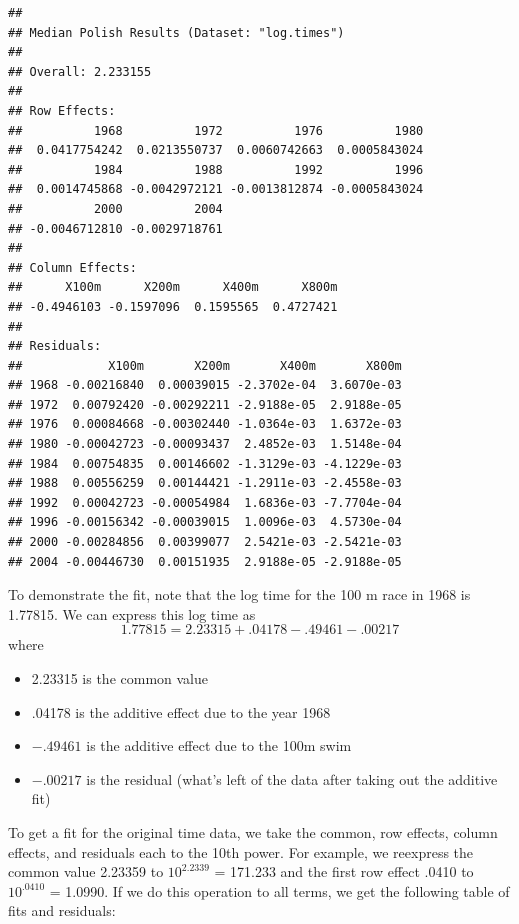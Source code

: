 \documentclass[
]{book}
\newenvironment{Shaded}{\begin{snugshade}}{\end{snugshade}}
\newcommand{\DecValTok}[1]{\textcolor[rgb]{0.00,0.00,0.81}{#1}}
\newcommand{\NormalTok}[1]{#1}
\newcommand{\OtherTok}[1]{\textcolor[rgb]{0.56,0.35,0.01}{#1}}
\newcommand{\SpecialCharTok}[1]{\textcolor[rgb]{0.00,0.00,0.00}{#1}}
\providecommand{\tightlist}{%
  \setlength{\itemsep}{0pt}\setlength{\parskip}{0pt}}
\begin{document}
\begin{verbatim}
## 
## Median Polish Results (Dataset: "log.times")
## 
## Overall: 2.233155
## 
## Row Effects:
##          1968          1972          1976          1980 
##  0.0417754242  0.0213550737  0.0060742663  0.0005843024 
##          1984          1988          1992          1996 
##  0.0014745868 -0.0042972121 -0.0013812874 -0.0005843024 
##          2000          2004 
## -0.0046712810 -0.0029718761 
## 
## Column Effects:
##      X100m      X200m      X400m      X800m 
## -0.4946103 -0.1597096  0.1595565  0.4727421 
## 
## Residuals:
##            X100m       X200m       X400m       X800m
## 1968 -0.00216840  0.00039015 -2.3702e-04  3.6070e-03
## 1972  0.00792420 -0.00292211 -2.9188e-05  2.9188e-05
## 1976  0.00084668 -0.00302440 -1.0364e-03  1.6372e-03
## 1980 -0.00042723 -0.00093437  2.4852e-03  1.5148e-04
## 1984  0.00754835  0.00146602 -1.3129e-03 -4.1229e-03
## 1988  0.00556259  0.00144421 -1.2911e-03 -2.4558e-03
## 1992  0.00042723 -0.00054984  1.6836e-03 -7.7704e-04
## 1996 -0.00156342 -0.00039015  1.0096e-03  4.5730e-04
## 2000 -0.00284856  0.00399077  2.5421e-03 -2.5421e-03
## 2004 -0.00446730  0.00151935  2.9188e-05 -2.9188e-05
\end{verbatim}

To demonstrate the fit, note that the log time for the 100 m race in 1968 is 1.77815. We can express this log time as
\[
1.77815 = 2.23315 + .04178 - .49461 - .00217
\]
where

\begin{itemize}
\tightlist
\item
  2.23315 is the common value
\item
  .04178 is the additive effect due to the year 1968
\item
  \(-.49461\) is the additive effect due to the 100m swim
\item
  \(-.00217\) is the residual (what's left of the data after taking out the additive fit)
\end{itemize}

To get a fit for the original time data, we take the common, row effects, column effects, and residuals each to the 10th power. For example, we reexpress the common value 2.23359 to \(10^{2.2339}\) = 171.233 and the first row effect .0410 to \(10^{.0410}\) = 1.0990. If we do this operation to all terms, we get the following table of fits and residuals:

\begin{Shaded}
\end{Shaded}
\end{document}
